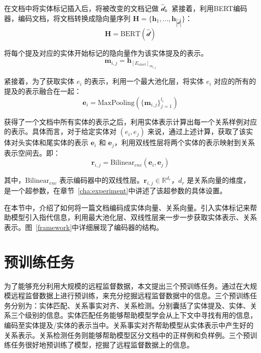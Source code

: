 在文档中将实体标记插入后，将被改变的文档记做 $\hat{\mathcal{d}}$。紧接着，利用BERT编码器，编码文档，将文档转换成隐向量序列 $\mathbf{H} = \{\mathbf{h}_1,...,\mathbf{h}_{|\hat{\mathcal{d}}|}\}$：
\begin{equation}
	\mathbf{H} = \text{BERT}(\hat{\mathcal{d}})
\end{equation}

将每个提及对应的实体开始标记的隐向量作为该实体提及的表示。
\begin{equation}
	\mathbf{m}_{i,j} = \mathbf{h}_{[E_{start}]_{m_{i,j}}}
\end{equation}

紧接着，为了获取实体 $e_i$ 的表示，利用一个最大池化层，将实体 $e_i$ 对应的所有的提及的表示融合在一起：
\begin{equation}
	\mathbf{e}_i = \text{MaxPooling}\left(\{\mathbf{m}_{i,j}\}_{j=1}^{l_i}\right)
\end{equation}

获得了一个文档中所有实体的表示之后，利用实体表示计算出每一个关系样例对应的表示。具体而言，对于给定实体对 $(e_i, e_j)$ 来说，通过上述计算，获取了该实体对头实体和尾实体的表示 $\mathbf{e}_i$ 和 $\mathbf{e}_j$，利用双线性层将两个实体的表示映射到关系表示空间去。即：
\begin{equation}
	\mathbf{r}_{i,j} = \text{Bilinear}_{enc}(\mathbf{e}_i, \mathbf{e}_j)
\end{equation}

其中，$\text{Bilinear}_{enc}$ 表示编码器中的双线性层。$\mathbf{r}_{i,j} \in \mathbb{R}^{d_r}$，$d_r$ 是关系向量的维度，是一个超参数，在章节~\ref{cha:experiment}中讲述了该超参数的具体设置。

\hspace*{\fill}

在本节中，介绍了如何将一篇文档编码成实体向量、关系向量。引入实体标记来帮助模型引入指代信息，利用最大池化层、双线性层来一步一步获取实体表示、关系表示。图~\ref{framework}中详细展现了编码器的结构。


\section{预训练任务}
为了能够充分利用大规模的远程监督数据，本文提出三个预训练任务。通过在大规模远程监督数据上进行预训练，来充分挖掘远程监督数据中的信息。三个预训练任务分别为：实体匹配、关系事实对齐、关系检测。分别囊括了实体提及、实体、关系三个级别的信息。实体匹配任务能够帮助模型学会从上下文中寻找有用的信息，编码至实体提及/实体的表示当中。关系事实对齐帮助模型从实体表示中产生好的关系表示。关系检测任务则能够帮助模型区分文档中的正样例和负样例。三个预训练任务很好地预训练了模型，挖掘了远程监督数据上的信息。


